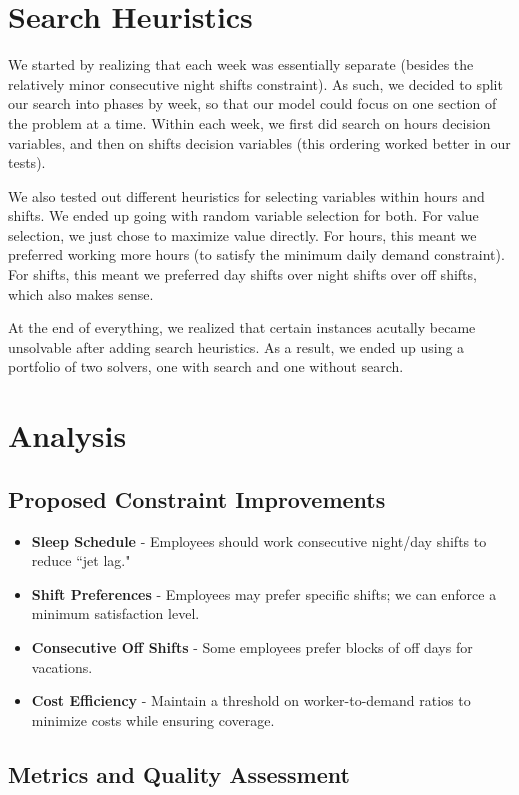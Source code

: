 \documentclass[11pt]{article}
\begin{document}
\section*{Search Heuristics}
We started by realizing that each week was essentially separate (besides the relatively minor consecutive night shifts constraint). As such, we decided to split our search into phases by week, so that our model could focus on one section of the problem at a time. Within each week, we first did search on hours decision variables, and then on shifts decision variables (this ordering worked better in our tests). 

We also tested out different heuristics for selecting variables within hours and shifts. We ended up going with random variable selection for both. For value selection, we just chose to maximize value directly. For hours, this meant we preferred working more hours (to satisfy the minimum daily demand constraint). For shifts, this meant we preferred day shifts over night shifts over off shifts, which also makes sense.

At the end of everything, we realized that certain instances acutally became unsolvable after adding search heuristics. As a result, we ended up using a portfolio of two solvers, one with search and one without search.

\section*{Analysis}

\subsection*{Proposed Constraint Improvements}
\begin{itemize}
    \item \textbf{Sleep Schedule} - Employees should work consecutive night/day shifts to reduce ``jet lag."
    \item \textbf{Shift Preferences} - Employees may prefer specific shifts; we can enforce a minimum satisfaction level.
    \item \textbf{Consecutive Off Shifts} - Some employees prefer blocks of off days for vacations.
    \item \textbf{Cost Efficiency} - Maintain a threshold on worker-to-demand ratios to minimize costs while ensuring coverage.
\end{itemize}

\subsection*{Metrics and Quality Assessment}
\end{document}
